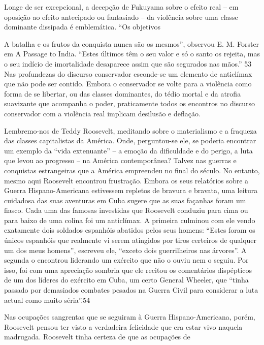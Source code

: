  \par 
Longe de ser excepcional, a decepção de Fukuyama sobre o efeito real – em oposição ao efeito antecipado ou fantasiado – da violência sobre uma classe dominante dissipada é emblemática. “Os objetivos
 \par 
A batalha e os frutos da conquista nunca são os mesmos”, observou E. M. Forster em A Passage to India. “Estes últimos têm o seu valor e só o santo os rejeita, mas o seu indício de imortalidade desaparece assim que são segurados nas mãos.” {\color{blue}53} Nas profundezas do discurso conservador esconde-se um elemento de anticlímax que não pode ser contido. Embora o conservador se volte para a violência como forma de se libertar, ou das classes dominantes, do tédio mortal e da atrofia suavizante que acompanha o poder, praticamente todos os encontros no discurso conservador com a violência real implicam desilusão e deflação.
 \par 
Lembremo-nos de Teddy Roosevelt, meditando sobre o materialismo e a fraqueza das classes capitalistas da América. Onde, perguntou-se ele, se poderia encontrar um exemplo da “vida extenuante” – a emoção da dificuldade e do perigo, a luta que levou ao progresso – na América contemporânea? Talvez nas guerras e conquistas estrangeiras que a América empreendeu no final do século. No entanto, mesmo aqui Roosevelt encontrou frustração. Embora os seus relatórios sobre a Guerra Hispano-Americana estivessem repletos de bravura e bravata, uma leitura cuidadosa das suas aventuras em Cuba sugere que as suas façanhas foram um fiasco. Cada uma das famosas investidas que Roosevelt conduziu para cima ou para baixo de uma colina foi um anticlímax. A primeira culminou com ele vendo exatamente dois soldados espanhóis abatidos pelos seus homens: “Estes foram os únicos espanhóis que realmente vi serem atingidos por tiros certeiros de qualquer um dos meus homens”, escreveu ele, “exceto dois guerrilheiros nas árvores”. A segunda o encontrou liderando um exército que não o ouviu nem o seguiu. Por isso, foi com uma apreciação sombria que ele recitou os comentários dispépticos de um dos líderes do exército em Cuba, um certo General Wheeler, que “tinha passado por demasiados combates pesados ​​na Guerra Civil para considerar a luta actual como muito séria”.{\color{blue}54}
 \par 
Nas ocupações sangrentas que se seguiram à Guerra Hispano-Americana, porém, Roosevelt pensou ter visto a verdadeira felicidade que era estar vivo naquela madrugada. Roosevelt tinha certeza de que as ocupações de
 \par 
